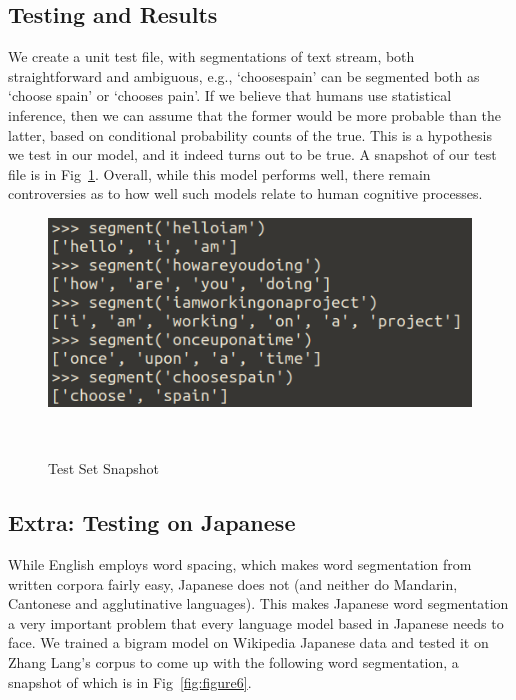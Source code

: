 \documentclass{article}
\begin{document}
\subsection{Testing and Results}
\vspace{-1mm}
We create a unit test file, with segmentations of text stream, both straightforward and ambiguous, e.g., `choosespain' can be segmented both as `choose spain' or `chooses pain'. If we believe that humans use statistical inference, then we can assume that the former would be more probable than the latter, based on conditional probability counts of the true. This is a hypothesis we test in our model, and it indeed turns out to be true. A snapshot of our test file is in Fig~\ref{fig:figure5}. Overall, while this model performs well, there remain controversies as to how well such models relate to human cognitive processes.
\vspace{-1mm}
\begin{figure}[h!]
  \centering
  \includegraphics[scale=0.8]{figures/ngram_test_set.png}
  \caption{Test Set Snapshot}~\label{fig:figure5}
\end{figure}

\subsection{Extra: Testing on Japanese}
\vspace{-1mm}
While English employs word spacing, which makes word segmentation from written corpora fairly easy, Japanese does not (and neither do Mandarin, Cantonese and agglutinative languages). This makes Japanese word segmentation a very important problem that every language model based in Japanese needs to face. We trained a bigram model on Wikipedia Japanese data and tested it on Zhang Lang's corpus to come up with the following word segmentation, a snapshot of which is in Fig~\ref{fig:figure6}.
\end{document}
